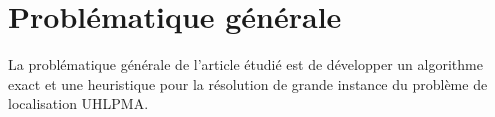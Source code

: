 \section{Problématique générale}

La problématique générale de l'article étudié est de développer un algorithme exact et une heuristique pour la résolution de grande instance du problème de localisation UHLPMA.




 
